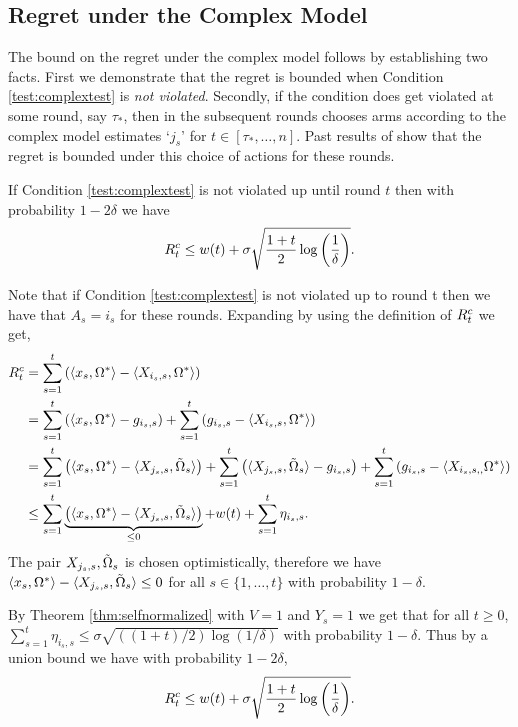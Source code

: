 \subsection{Regret under the Complex Model}

The bound on the regret under the complex model follows by establishing two facts. First we demonstrate that the regret is bounded when Condition \eqref{test:complextest} is \emph{not violated}. Secondly, if the condition does get violated at some round, say $\tau_*$, then in the subsequent rounds \algname chooses arms according to the complex model estimates `$j_s$' for $t \in [\tau_*,\ldots,n]$. Past results of \citep{abbasi2011improved} show that the regret is bounded under this choice of actions for these rounds. 

\begin{lemma} \label{lem:complexmodeltestnotviolated} If Condition \eqref{test:complextest} is not violated up until round $t$ then with probability $1-2\delta$ we have
\begin{align*}
    R^c_{t} \le w(t) + \sigma \sqrt{\frac{1+t}{2}\log \left(\frac{1}{\delta}\right)}.
\end{align*}
\end{lemma}
\begin{Proof}
Note that if Condition \eqref{test:complextest} is not violated up to round t then we have that $A_s = i_s$ for these rounds. Expanding by using the definition of $R^c_{t}$ we get,
\begin{align*}
    R^c_{t} & = \sum_{s=1}^t \left( \langle x_s,\Omega^* \rangle - \langle X_{i_s,s}, \Omega^* \rangle \right)\\
    & = \sum_{s=1}^t \left( \langle x_s, \Omega^* \rangle - g_{i_s,s}\right) + \sum_{s=1}^t \left(g_{i_s,s} -\langle X_{i_s,s},\Omega^*\rangle  \right)\\
    & = \sum_{s=1}^t \left(\langle x_s,\Omega^* \rangle - \langle X_{j_s,s},\tilde{\Omega}_s \rangle \right) + \sum_{s=1}^t \left(\langle X_{j_s,s},\tilde{\Omega}_s \rangle - g_{i_s,s} \right) + \sum_{s=1}^t \left( g_{i_s,s} - \langle X_{i_s,s,,}\Omega^*\rangle \right) \\
    & \le \sum_{s=1}^t \underbrace{\left(\langle x_s,\Omega^* \rangle - \langle X_{j_s,s},\tilde{\Omega}_s \rangle \right)}_{\le 0} + w(t) + \sum_{s=1}^t\eta_{i_s,s} .
\end{align*}
The pair $X_{j_s,s},\tilde{\Omega}_s$ is chosen optimistically, therefore we have $\langle x_s,\Omega^* \rangle - \langle X_{j_s,s},\tilde{\Omega}_s \rangle \le 0$ for all $s \in \{1,\ldots,t\}$ with probability $1-\delta$. 

By Theorem \ref{thm:selfnormalized} with $V=1$ and $Y_s = 1$ we get that for all $t\ge 0$, $\sum_{s=1}^t\eta_{i_s,s}  \le \sigma \sqrt{((1+t)/2)\log(1/\delta)}$ with probability $1-\delta$. Thus by a union bound we have with probability $1-2\delta$,
\begin{align*}
    R^c_{t} \le w(t) + \sigma \sqrt{\frac{1+t}{2}\log \left(\frac{1}{\delta}\right)}.
\end{align*}
\end{Proof}
